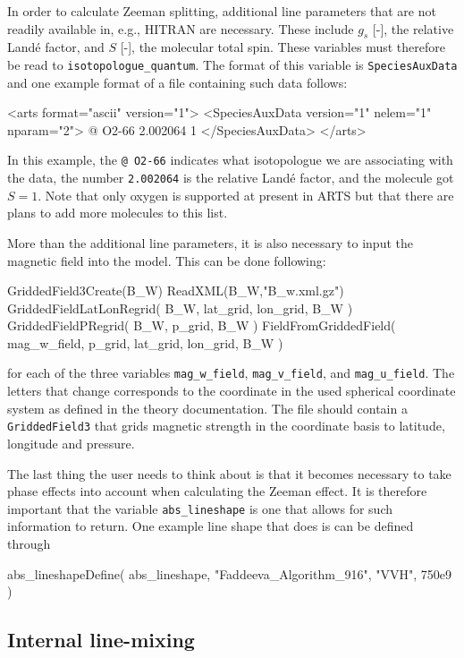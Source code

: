 In order to calculate Zeeman splitting, additional line parameters that are not readily
available in, e.g., HITRAN are necessary. These include $g_s$ [-], the relative Land\'{e} factor,
and $S$ [-], the molecular total spin. These variables must therefore be read to \verb|isotopologue_quantum|.
The format of this variable is \verb|SpeciesAuxData| and one example format of a file containing such data
follows:
\begin{code}
<arts format="ascii" version="1">
  <SpeciesAuxData version="1" nelem="1" nparam="2">
    @ O2-66 2.002064 1
  </SpeciesAuxData>
</arts>
\end{code}
In this example, the \verb|@ O2-66| indicates what isotopologue we are associating 
with the data, the number \verb|2.002064| is the relative Land\'{e} factor, and 
the molecule got $S=1$.
Note that only oxygen is supported at present in ARTS but that there are plans to 
add more molecules to this list.

More than the additional line parameters, it is also necessary to input the magnetic
field into the model. This can be done following:
\begin{code}
GriddedField3Create(B_W)
  ReadXML(B_W,"B_w.xml.gz")
  GriddedFieldLatLonRegrid( B_W, lat_grid, lon_grid, B_W )
  GriddedFieldPRegrid( B_W, p_grid, B_W )
  FieldFromGriddedField( mag_w_field, p_grid, lat_grid, 
                         lon_grid, B_W )
\end{code}
for each of the three variables \verb|mag_w_field|, 
\verb|mag_v_field|, and \verb|mag_u_field|. The letters that change corresponds to
the coordinate in the used spherical coordinate system as defined in the theory
documentation. The file should contain a \verb|GriddedField3| that grids magnetic
strength in the coordinate basis to latitude, longitude and pressure.

The last thing the user needs to think about is that it becomes necessary to take 
phase effects into account when calculating the Zeeman effect. It is therefore 
important that the variable \verb|abs_lineshape| is one that allows for such 
information to return. One example line shape that does is can be defined through
\begin{code}
abs_lineshapeDefine( abs_lineshape, "Faddeeva_Algorithm_916", 
                     "VVH", 750e9 )
\end{code}

\subsection{Internal line-mixing}
\label{sec:absorption:line-mixing}

